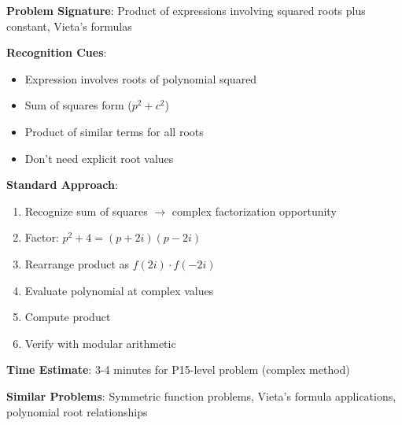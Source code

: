 \documentclass[12pt]{article}
\begin{document}
\textbf{Problem Signature}: Product of expressions involving squared roots plus constant, Vieta's formulas

\textbf{Recognition Cues}:
\begin{itemize}
    \item Expression involves roots of polynomial squared
    \item Sum of squares form ($p^2 + c^2$)
    \item Product of similar terms for all roots
    \item Don't need explicit root values
\end{itemize}

\textbf{Standard Approach}:
\begin{enumerate}
    \item Recognize sum of squares $\to$ complex factorization opportunity
    \item Factor: $p^2 + 4 = (p + 2i)(p - 2i)$
    \item Rearrange product as $f(2i) \cdot f(-2i)$
    \item Evaluate polynomial at complex values
    \item Compute product
    \item Verify with modular arithmetic
\end{enumerate}

\textbf{Time Estimate}: 3-4 minutes for P15-level problem (complex method)

\textbf{Similar Problems}: Symmetric function problems, Vieta's formula applications, polynomial root relationships
\end{document}
